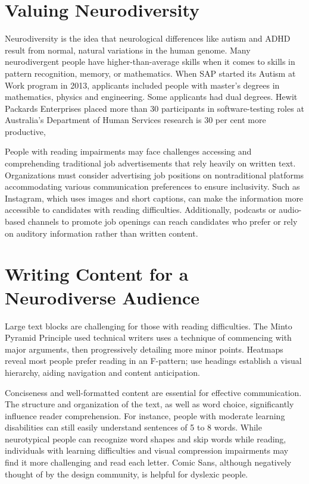 \documentclass[main.tex]{subfiles}
\begin{document}
\section{Valuing Neurodiversity }

Neurodiversity is the idea that neurological differences like autism and ADHD result from normal, natural variations in the human genome. Many neurodivergent people have higher-than-average skills when it comes to skills in pattern recognition, memory, or mathematics. When SAP started its Autism at Work program in 2013, applicants included people with master's degrees in mathematics, physics and engineering. Some applicants had dual degrees. Hewit Packards Enterprises placed more than 30 participants in software-testing roles at Australia's Department of Human Services research is 30 per cent more productive, \cite{Pisano}  

People with reading impairments may face challenges accessing and comprehending traditional job advertisements that rely heavily on written text. Organizations must consider advertising job positions on nontraditional platforms accommodating various communication preferences to ensure inclusivity. Such as Instagram, which uses images and short captions, can make the information more accessible to candidates with reading difficulties. Additionally, podcasts or audio-based channels to promote job openings can reach candidates who prefer or rely on auditory information rather than written content.


\section{Writing Content for a Neurodiverse Audience}
 
Large text blocks are challenging for those with reading difficulties. The Minto Pyramid Principle used technical writers uses a technique of commencing with major arguments, then progressively detailing more minor points. Heatmaps reveal most people prefer reading in an F-pattern; use headings establish a visual hierarchy, aiding navigation and content anticipation. 

Conciseness and well-formatted content are essential for effective communication. The structure and organization of the text, as well as word choice, significantly influence reader comprehension. For instance, people with moderate learning disabilities can still easily understand sentences of 5 to 8 words. While neurotypical people can recognize word shapes and skip words while reading, individuals with learning difficulties and visual compression impairments may find it more challenging and read each letter. Comic Sans, although negatively thought of by the design community, is helpful for dyslexic people.
\end{document}

